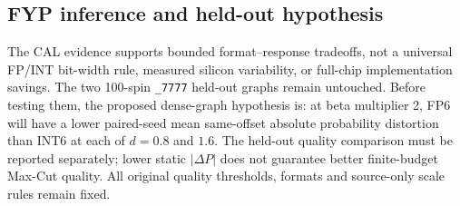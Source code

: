 \subsection{FYP inference and held-out hypothesis}
The CAL evidence supports bounded format--response tradeoffs, not
a universal FP/INT bit-width rule, measured silicon variability,
or full-chip implementation savings. The two 100-spin
\texttt{\_7777} held-out graphs remain untouched.
Before testing them, the proposed dense-graph hypothesis is:
at beta multiplier 2, FP6 will have a lower paired-seed mean
same-offset absolute probability distortion than INT6 at each
of $d=0.8$ and $1.6$. The held-out quality comparison must be
reported separately; lower static $|\Delta P|$ does not guarantee
better finite-budget Max-Cut quality. All original quality
thresholds, formats and source-only scale rules remain fixed.
